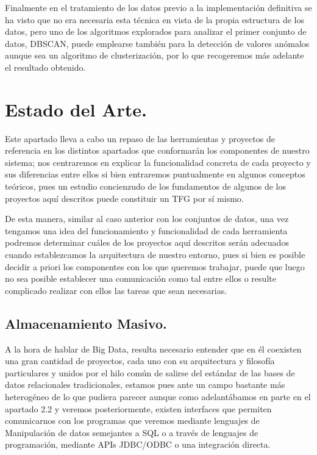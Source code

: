 \documentclass[11pt, a4paper]{article} %
\begin{document}
Finalmente en el tratamiento de los datos previo a la implementación definitiva se ha visto que no era necesaria esta técnica en vista de la propia estructura de los datos, pero uno de los algoritmos explorados para analizar el primer conjunto de datos, DBSCAN, puede emplearse también para la detección de valores anómalos aunque sea un algoritmo de clusterización, por lo que recogeremos más adelante el resultado obtenido.
\section{Estado del Arte.}
Este apartado lleva a cabo un repaso de las herramientas y proyectos de referencia en los distintos apartados que conformarán los componentes de nuestro sistema; nos centraremos en explicar la funcionalidad concreta de cada proyecto y sus diferencias entre ellos si bien entraremos puntualmente en algunos conceptos teóricos, pues un estudio concienzudo de los fundamentos de algunos de los proyectos aquí descritos puede constituir un TFG por sí mismo.


De esta manera, similar al caso anterior con los conjuntos de datos, una vez tengamos una idea del funcionamiento y funcionalidad de cada herramienta podremos determinar cuáles de los proyectos aquí descritos serán adecuados cuando establezcamos la arquitectura de nuestro entorno, pues si bien es posible decidir a priori los componentes con los que queremos trabajar, puede que luego no sea posible establecer una comunicación como tal entre ellos o resulte complicado realizar con ellos las tareas que sean necesarias.
\subsection{Almacenamiento Masivo.}
A la hora de hablar de Big Data, resulta necesario entender que en él coexisten una gran cantidad de proyectos, cada uno con su arquitectura y filosofía particulares y unidos por el hilo común de salirse del estándar de las bases de datos relacionales tradicionales, estamos pues ante un campo bastante más heterogéneo de lo que pudiera parecer aunque como adelantábamos en parte en el apartado 2.2 y veremos posteriormente, existen interfaces que permiten comunicarnos con los programas que veremos mediante lenguajes de Manipulación de datos  semejantes a SQL o a través de lenguajes de programación, mediante APIs JDBC/ODBC o una integración directa. \cite{docazure} \cite{docaws}
\end{document}
